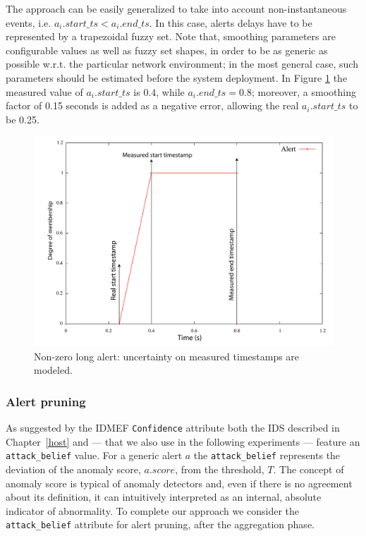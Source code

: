 The approach can be easily generalized to take into account
non\hyp{}instantaneous events, i.e. $a_{i}.start\_ts <
a_{i}.end\_ts$. In this case, alerts delays have to be represented by
a trapezoidal fuzzy set. Note that, smoothing parameters are
configurable values as well as fuzzy set shapes, in order to be as
generic as possible w.r.t. the particular network environment; in the
most general case, such parameters should be estimated before the
system deployment. In Figure \ref{fig:fuzzy_alert_trapez} the measured
value of $a_{i}.start\_ts$ is $0.4$, while $a_{i}.end\_ts = 0.8$;
moreover, a smoothing factor of 0.15 seconds is added as a negative
error, allowing the real $a_{i}.start\_ts$ to be 0.25.

\begin{figure}[t]
  \centering
  \includegraphics[width=\textwidth]{figures/correlation/fusion/fuzzy_alert_trapez}
  \caption{Non-zero long alert: uncertainty on measured timestamps are modeled.}
  \label{fig:fuzzy_alert_trapez}
\end{figure}

\subsubsection{Alert pruning}
\label{correlation:fusion:fuzzy-based-pruning}
As suggested by the \ac{IDMEF} \texttt{Confidence} attribute both the \ac{IDS} described in Chapter~\ref{host} and \citep{zanero-savaresi,zanero-pattern} --- that we also use in the following experiments --- feature an \texttt{attack\_belief} value. For a generic alert $a$ the \texttt{attack\_belief} represents the deviation of the anomaly score, $a.score$, from the threshold, $T$. The concept of anomaly score is typical of anomaly detectors and, even if there is no agreement about its definition, it can intuitively interpreted as an internal, absolute indicator of abnormality. To complete our approach we consider the \texttt{attack\_belief} attribute for alert pruning, after the aggregation phase.

